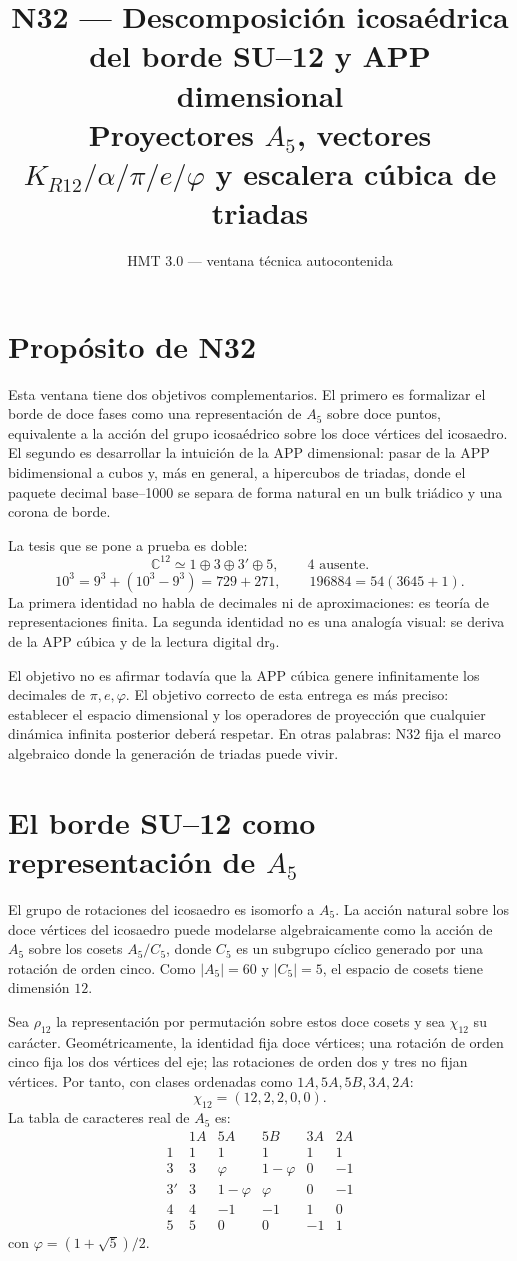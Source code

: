 \documentclass[11pt,a4paper]{article}
\title{\bfseries N32 --- Descomposición icosaédrica del borde SU--12 y APP dimensional\\
\large Proyectores $A_5$, vectores $K_{R12}/\alpha/\pi/e/\varphi$ y escalera cúbica de triadas}
\author{HMT 3.0 --- ventana técnica autocontenida}
\date{}
\newcommand{\C}{\mathbb C}
\newcommand{\dr}{\mathrm{dr}_9}
\begin{document}
\maketitle

\section*{Propósito de N32}
Esta ventana tiene dos objetivos complementarios. El primero es formalizar el borde de doce fases como una representación de $A_5$ sobre doce puntos, equivalente a la acción del grupo icosaédrico sobre los doce vértices del icosaedro. El segundo es desarrollar la intuición de la APP dimensional: pasar de la APP bidimensional a cubos y, más en general, a hipercubos de triadas, donde el paquete decimal base--1000 se separa de forma natural en un bulk triádico y una corona de borde.

La tesis que se pone a prueba es doble:
\[
\boxed{\C^{12}\simeq 1\oplus3\oplus3'\oplus5,\qquad 4\text{ ausente}.}
\]
\[
\boxed{10^3=9^3+(10^3-9^3)=729+271,\qquad 196884=54(3645+1).}
\]
La primera identidad no habla de decimales ni de aproximaciones: es teoría de representaciones finita. La segunda identidad no es una analogía visual: se deriva de la APP cúbica y de la lectura digital $\dr$.

El objetivo no es afirmar todavía que la APP cúbica genere infinitamente los decimales de $\pi,e,\varphi$. El objetivo correcto de esta entrega es más preciso: establecer el espacio dimensional y los operadores de proyección que cualquier dinámica infinita posterior deberá respetar. En otras palabras: N32 fija el marco algebraico donde la generación de triadas puede vivir.

\section{El borde SU--12 como representación de $A_5$}
El grupo de rotaciones del icosaedro es isomorfo a $A_5$. La acción natural sobre los doce vértices del icosaedro puede modelarse algebraicamente como la acción de $A_5$ sobre los cosets $A_5/C_5$, donde $C_5$ es un subgrupo cíclico generado por una rotación de orden cinco. Como $|A_5|=60$ y $|C_5|=5$, el espacio de cosets tiene dimensión $12$.

Sea $\rho_{12}$ la representación por permutación sobre estos doce cosets y sea $\chi_{12}$ su carácter. Geométricamente, la identidad fija doce vértices; una rotación de orden cinco fija los dos vértices del eje; las rotaciones de orden dos y tres no fijan vértices. Por tanto, con clases ordenadas como $1A,5A,5B,3A,2A$:
\[
\chi_{12}=(12,2,2,0,0).
\]
La tabla de caracteres real de $A_5$ es:
\[
\begin{array}{c|ccccc}
 & 1A & 5A & 5B & 3A & 2A\\
\hline
1 & 1&1&1&1&1\\
3 & 3&\varphi&1-\varphi&0&-1\\
3'&3&1-\varphi&\varphi&0&-1\\
4&4&-1&-1&1&0\\
5&5&0&0&-1&1
\end{array}
\]
con $\varphi=(1+\sqrt5)/2$.
\end{document}
